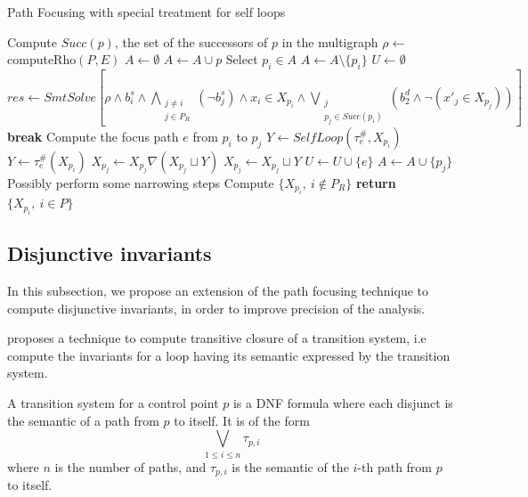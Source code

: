 \documentclass[a4paper,english,titlepage,11pt]{article}
\begin{document}
\begin{algorithm}
\caption{Path Focusing with special treatment for self loops}
\label{pathfocusingoptalgo}
\begin{algorithmic}[1] 
	\State Compute $Succ(p)$, the set of the successors of $p$ in the multigraph
\EndFor
\State $\rho \gets$ computeRho$(P,E)$
\State $A \gets \emptyset$
	\State $A \gets A \cup p$
\EndFor
{}
	\State Select $p_i \in A$
	\State $A \gets A \setminus \{p_i\}$
	\State $U \gets \emptyset$
		\State $res \gets SmtSolve\left[\rho \wedge b_i^s \wedge
		\displaystyle\bigwedge_{\substack{j\neq i \\
		j\in P_R}} (\neg b_j^s) \wedge x_i \in X_{p_i} \wedge
		\bigvee_{\substack{j \\ p_j\in Succ(p_i)}} \left(b_2^d \wedge \neg (x'_j \in
		X_{p_j})\right)\right]$
			\State \textbf{break}
		\EndIf
		\State Compute the focus path $e$ from $p_i$ to $p_j$
			\State $Y \gets SelfLoop(\tau_e^\#,X_{p_i})$
		\Else
			\State $Y \gets \tau_e^\#(X_{p_i})$
		\EndIf
			\State $X_{p_j} \gets X_{p_j} \nabla (X_{p_j} \sqcup Y)$
		\Else
			\State $X_{p_j} \gets X_{p_j} \sqcup Y$
			\State $U \gets U \cup \{e\}$
		\EndIf
		\State $A \gets A \cup \{p_j\}$
	\EndWhile
\EndWhile
\State Possibly perform some narrowing steps
\State Compute $\{X_{p_i},\ i \notin P_R\}$
\State \textbf{return} $\{X_{p_i},\ i \in P\}$
\EndProcedure
\end{algorithmic}
\end{algorithm}

	\subsection{Disjunctive invariants}

	In this subsection, we propose an extension of the path focusing technique
	to compute disjunctive invariants, in order to improve precision of the
	analysis.

	\cite{GulwaniZ10} proposes a technique to compute transitive closure of a
	transition system, i.e compute the invariants for a loop having its semantic
	expressed by the transition system.

	A transition system for a control point $p$ is a DNF formula where each
	disjunct is the semantic of a path from $p$ to itself. It is of the form
	$$\bigvee_{1 \leq i \leq n} \tau_{p,i}$$ where $n$ is the number of
	paths, and $\tau_{p,i}$ is the semantic of the $i$-th path from $p$ to itself.
\end{document}
